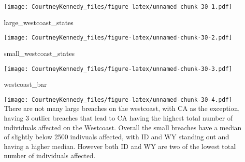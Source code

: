 \documentclass[
]{article}
\newenvironment{Shaded}{\begin{snugshade}}{\end{snugshade}}
\newcommand{\NormalTok}[1]{#1}
\begin{document}
\texttt{[image: CourtneyKennedy\_files/figure-latex/unnamed-chunk-30-1.pdf]}

\begin{Shaded}
\begin{Highlighting}[]
\NormalTok{large\_westcoast\_states}
\end{Highlighting}
\end{Shaded}

\texttt{[image: CourtneyKennedy\_files/figure-latex/unnamed-chunk-30-2.pdf]}

\begin{Shaded}
\begin{Highlighting}[]
\NormalTok{small\_westcoast\_states}
\end{Highlighting}
\end{Shaded}

\texttt{[image: CourtneyKennedy\_files/figure-latex/unnamed-chunk-30-3.pdf]}

\begin{Shaded}
\begin{Highlighting}[]
\NormalTok{westcoast\_bar}
\end{Highlighting}
\end{Shaded}

\texttt{[image: CourtneyKennedy\_files/figure-latex/unnamed-chunk-30-4.pdf]}
There are not many large breaches on the westcoast, with CA as the
exception, having 3 outlier breaches that lead to CA having the highest
total number of individuals affected on the Westcoast. Overall the small
breaches have a median of slightly below 2500 indivuals affected, with
ID and WY standing out and having a higher median. However both ID and
WY are two of the lowest total number of individuals affected.
\end{document}
